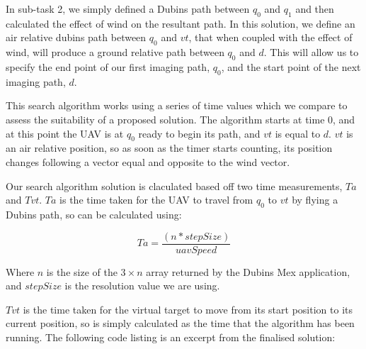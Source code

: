 In sub-task 2, we simply defined a Dubins path between $q_0$ and $q_1$ and then calculated the effect of wind on the resultant path. In this solution, we define an air relative dubins path between $q_0$ and $vt$, that when coupled with the effect of wind, will produce a ground relative path between $q_0$ and $d$. This will allow us to specify the end point of our first imaging path, $q_0$, and the start point of the next imaging path, $d$. 

This search algorithm works using a series of time values which we compare to assess the suitability of a proposed solution. The algorithm starts at time 0, and at this point the UAV is at $q_0$ ready to begin its path, and $vt$ is equal to $d$. $vt$ is an air relative position, so as soon as the timer starts counting, its position changes following a vector equal and opposite to the wind vector. 

Our search algorithm solution is claculated based off two time measurements, $Ta$ and $Tvt$. $Ta$ is the time taken for the UAV to travel from $q_0$ to $vt$ by flying a Dubins path, so can be calculated using:

\begin{equation}
	Ta = \frac{(n*stepSize)}{uavSpeed}
\end{equation}

Where $n$ is the size of the  $3 \times n$ array returned by the Dubins Mex application, and $stepSize$ is the resolution value we are using.

$Tvt$ is the time taken for the virtual target to move from its start position to its current position, so is simply calculated as the time that the algorithm has been running. The following code listing is an excerpt from the finalised solution:

